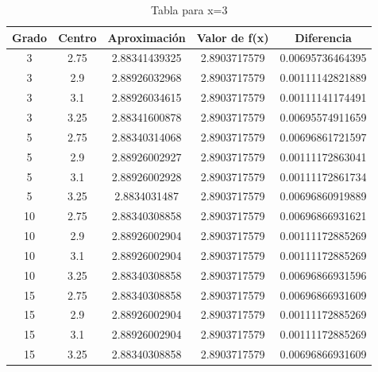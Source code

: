 \documentclass[a4paper,12pt]{report}
\begin{document}
\clearpage

\begin{table}[htb]
\begin{center}
  \caption{Tabla para x=3}
  \begin{tabular}{|c|c|c|c|c|} %
  \hline
         Grado  &  Centro  &  Aproximación    &  Valor de f(x)  &  Diferencia        \\ \hline
            3   &   2.75   &  2.88341439325   &  2.8903717579   &  0.00695736464395  \\ \hline
            3   &   2.9    &  2.88926032968   &  2.8903717579   &  0.00111142821889  \\ \hline
            3   &   3.1    &  2.88926034615   &  2.8903717579   &  0.00111141174491  \\ \hline
            3   &   3.25   &  2.88341600878   &  2.8903717579   &  0.00695574911659  \\ \hline
            5   &   2.75   &  2.88340314068   &  2.8903717579   &  0.00696861721597  \\ \hline
            5   &   2.9    &  2.88926002927   &  2.8903717579   &  0.00111172863041  \\ \hline
            5   &   3.1    &  2.88926002928   &  2.8903717579   &  0.00111172861734  \\ \hline
            5   &   3.25   &  2.8834031487    &  2.8903717579   &  0.00696860919889  \\ \hline
            10  &   2.75   &  2.88340308858   &  2.8903717579   &  0.00696866931621  \\ \hline
            10  &   2.9    &  2.88926002904   &  2.8903717579   &  0.00111172885269  \\ \hline
            10  &   3.1    &  2.88926002904   &  2.8903717579   &  0.00111172885269  \\ \hline
            10  &   3.25   &  2.88340308858   &  2.8903717579   &  0.00696866931596  \\ \hline
            15  &   2.75   &  2.88340308858   &  2.8903717579   &  0.00696866931609  \\ \hline
            15  &   2.9    &  2.88926002904   &  2.8903717579   &  0.00111172885269  \\ \hline
            15  &   3.1    &  2.88926002904   &  2.8903717579   &  0.00111172885269  \\ \hline
            15  &   3.25   &  2.88340308858   &  2.8903717579   &  0.00696866931609  \\ \hline
   \end{tabular}
   \label{Tabla2}
   \end{center}
\end{table}
\end{document}
